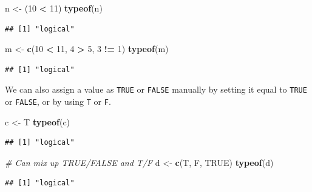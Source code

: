 \documentclass[
]{book}
\newenvironment{Shaded}{\begin{snugshade}}{\end{snugshade}}
\newcommand{\CommentTok}[1]{\textcolor[rgb]{0.56,0.35,0.01}{\textit{#1}}}
\newcommand{\DecValTok}[1]{\textcolor[rgb]{0.00,0.00,0.81}{#1}}
\newcommand{\KeywordTok}[1]{\textcolor[rgb]{0.13,0.29,0.53}{\textbf{#1}}}
\newcommand{\NormalTok}[1]{#1}
\newcommand{\OperatorTok}[1]{\textcolor[rgb]{0.81,0.36,0.00}{\textbf{#1}}}
\newcommand{\OtherTok}[1]{\textcolor[rgb]{0.56,0.35,0.01}{#1}}
\newcommand{\StringTok}[1]{\textcolor[rgb]{0.31,0.60,0.02}{#1}}
\begin{document}
\begin{Shaded}
\begin{Highlighting}[]
\NormalTok{n <-}\StringTok{ }\NormalTok{(}\DecValTok{10} \OperatorTok{<}\StringTok{ }\DecValTok{11}\NormalTok{)}
\KeywordTok{typeof}\NormalTok{(n)}
\end{Highlighting}
\end{Shaded}

\begin{verbatim}
## [1] "logical"
\end{verbatim}

\begin{Shaded}
\begin{Highlighting}[]
\NormalTok{m <-}\StringTok{ }\KeywordTok{c}\NormalTok{(}\DecValTok{10} \OperatorTok{<}\StringTok{ }\DecValTok{11}\NormalTok{, }\DecValTok{4} \OperatorTok{>}\StringTok{ }\DecValTok{5}\NormalTok{, }\DecValTok{3} \OperatorTok{!=}\StringTok{ }\DecValTok{1}\NormalTok{)}
\KeywordTok{typeof}\NormalTok{(m)}
\end{Highlighting}
\end{Shaded}

\begin{verbatim}
## [1] "logical"
\end{verbatim}

We can also assign a value as \texttt{TRUE} or \texttt{FALSE} manually by setting it equal to \texttt{TRUE} or \texttt{FALSE}, or by using \texttt{T} or \texttt{F}.

\begin{Shaded}
\begin{Highlighting}[]
\NormalTok{c <-}\StringTok{ }\NormalTok{T}
\KeywordTok{typeof}\NormalTok{(c)}
\end{Highlighting}
\end{Shaded}

\begin{verbatim}
## [1] "logical"
\end{verbatim}

\begin{Shaded}
\begin{Highlighting}[]
\CommentTok{# Can mix up TRUE/FALSE and T/F}
\NormalTok{d <-}\StringTok{ }\KeywordTok{c}\NormalTok{(T, F, }\OtherTok{TRUE}\NormalTok{)}
\KeywordTok{typeof}\NormalTok{(d)}
\end{Highlighting}
\end{Shaded}

\begin{verbatim}
## [1] "logical"
\end{verbatim}
\end{document}
